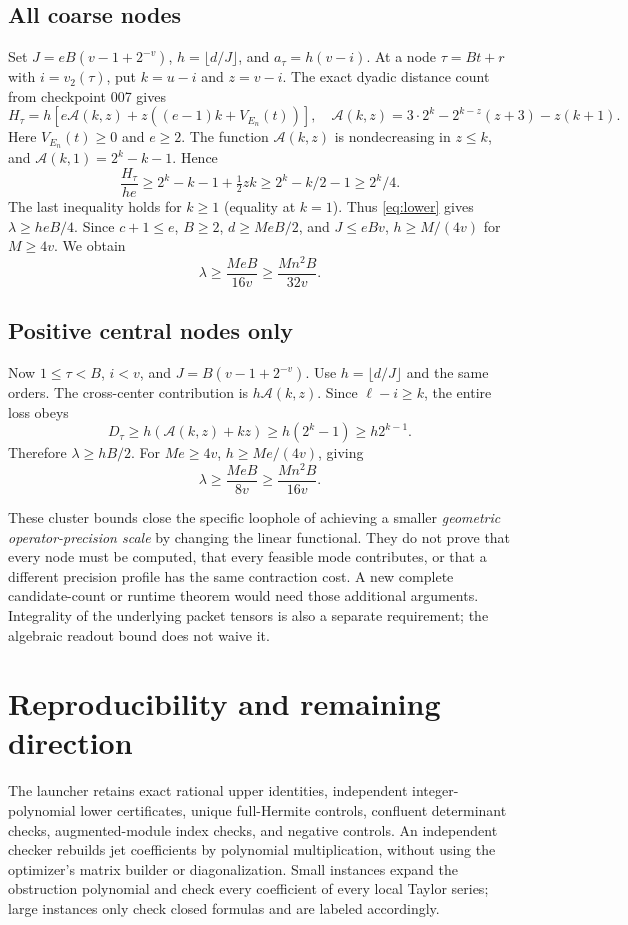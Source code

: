 \documentclass[11pt]{article}
\begin{document}
\subsection*{All coarse nodes}
Set $J=eB(v-1+2^{-v})$, $h=\lfloor d/J\rfloor$, and
$a_\tau=h(v-i)$. At a node $\tau=Bt+r$ with $i=v_2(\tau)$, put
$k=u-i$ and $z=v-i$. The exact dyadic distance count from checkpoint
007 gives
\[
 H_\tau=h\left[e\mathcal A(k,z)+
 z((e-1)k+V_{E_n}(t))\right],
\quad
 \mathcal A(k,z)=3\cdot2^k-2^{k-z}(z+3)-z(k+1).
\]
Here $V_{E_n}(t)\ge0$ and $e\ge2$.
The function $\mathcal A(k,z)$ is nondecreasing in $z\le k$, and
$\mathcal A(k,1)=2^k-k-1$. Hence
\[
 \frac{H_\tau}{he}\ge2^k-k-1+\tfrac12zk
 \ge2^k-k/2-1\ge2^k/4.
\]
The last inequality holds for $k\ge1$ (equality at $k=1$).
Thus \eqref{eq:lower} gives $\lambda\ge heB/4$.
Since $c+1\le e$, $B\ge2$, $d\ge MeB/2$, and $J\le eBv$,
$h\ge M/(4v)$ for $M\ge4v$. We obtain
\[
 \boxed{\lambda\ge\frac{MeB}{16v}
                   \ge\frac{Mn^2B}{32v}}.
\]

\subsection*{Positive central nodes only}
Now $1\le\tau<B$, $i<v$, and $J=B(v-1+2^{-v})$.
Use $h=\lfloor d/J\rfloor$ and the same orders.
The cross-center contribution is $h\mathcal A(k,z)$.
Since $\ell-i\ge k$, the entire loss obeys
\[
 D_\tau\ge h(\mathcal A(k,z)+kz)
             \ge h(2^k-1)\ge h2^{k-1}.
\]
Therefore $\lambda\ge hB/2$. For $Me\ge4v$,
$h\ge Me/(4v)$, giving
\[
 \boxed{\lambda\ge\frac{MeB}{8v}
                   \ge\frac{Mn^2B}{16v}}.
\]

These cluster bounds close the specific loophole of achieving a
smaller \emph{geometric operator-precision scale} by changing the
linear functional. They do not prove that every node must be computed,
that every feasible mode contributes, or that a different precision
profile has the same contraction cost. A new complete candidate-count
or runtime theorem would need those additional arguments. Integrality
of the underlying packet tensors is also a separate requirement;
the algebraic readout bound does not waive it.

\section{Reproducibility and remaining direction}
The launcher retains exact rational upper identities, independent
integer-polynomial lower certificates, unique full-Hermite controls,
confluent determinant checks, augmented-module index checks, and
negative controls. An independent checker rebuilds jet coefficients
by polynomial multiplication, without using the optimizer's matrix
builder or diagonalization. Small instances expand the obstruction
polynomial and check every coefficient of every local Taylor series;
large instances only check closed formulas and are labeled accordingly.
\end{document}
